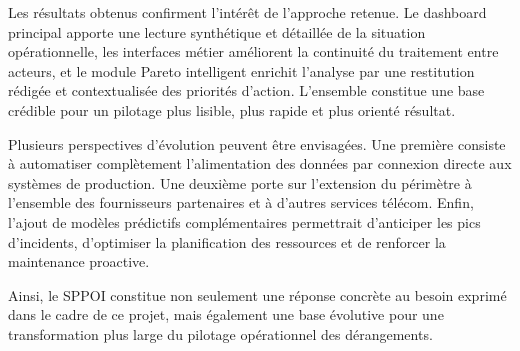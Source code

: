 \documentclass[10pt,a4paper]{report}
\begin{document}
Les résultats obtenus confirment l'intérêt de l'approche retenue. Le dashboard principal apporte une lecture synthétique et détaillée de la situation opérationnelle, les interfaces métier améliorent la continuité du traitement entre acteurs, et le module Pareto intelligent enrichit l'analyse par une restitution rédigée et contextualisée des priorités d'action. L'ensemble constitue une base crédible pour un pilotage plus lisible, plus rapide et plus orienté résultat.

Plusieurs perspectives d'évolution peuvent être envisagées. Une première consiste à automatiser complètement l'alimentation des données par connexion directe aux systèmes de production. Une deuxième porte sur l'extension du périmètre à l'ensemble des fournisseurs partenaires et à d'autres services télécom. Enfin, l'ajout de modèles prédictifs complémentaires permettrait d'anticiper les pics d'incidents, d'optimiser la planification des ressources et de renforcer la maintenance proactive.

Ainsi, le SPPOI constitue non seulement une réponse concrète au besoin exprimé dans le cadre de ce projet, mais également une base évolutive pour une transformation plus large du pilotage opérationnel des dérangements.
\end{document}
